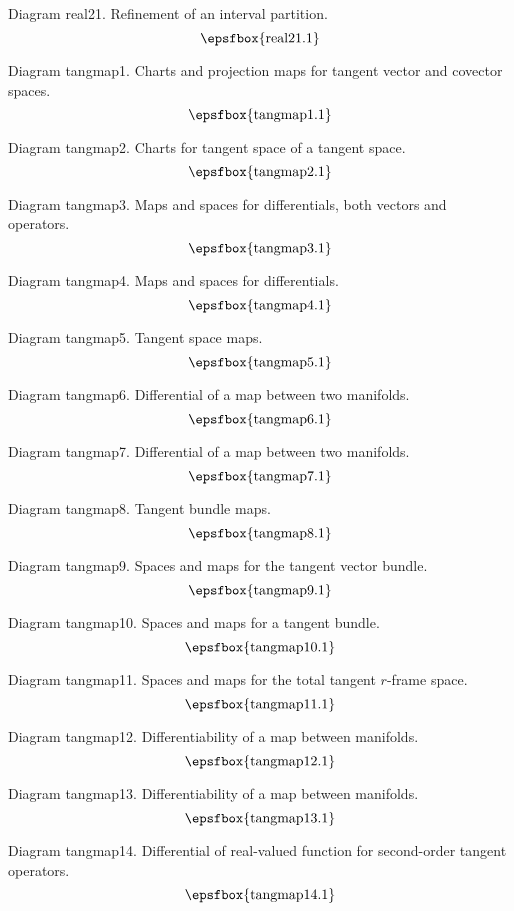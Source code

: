 Diagram real21. Refinement of an interval partition.
$$
\centerline{\epsfbox{real21.1}}
$$

\secteject
\edef\SECTtangmap{\the\pageno}

Diagram tangmap1. Charts and projection maps for tangent vector and covector
spaces.
$$
\centerline{\epsfbox{tangmap1.1}}
$$

Diagram tangmap2. Charts for tangent space of a tangent space.
$$
\centerline{\epsfbox{tangmap2.1}}
$$

Diagram tangmap3. Maps and spaces for differentials, both vectors and operators.
$$
\centerline{\epsfbox{tangmap3.1}}
$$

Diagram tangmap4. Maps and spaces for differentials.
$$
\centerline{\epsfbox{tangmap4.1}}
$$

\filleject

Diagram tangmap5. Tangent space maps.
$$
\centerline{\epsfbox{tangmap5.1}}
$$

Diagram tangmap6. Differential of a map between two manifolds.
$$
\centerline{\epsfbox{tangmap6.1}}
$$

Diagram tangmap7. Differential of a map between two manifolds.
$$
\centerline{\epsfbox{tangmap7.1}}
$$

Diagram tangmap8. Tangent bundle maps.
$$
\centerline{\epsfbox{tangmap8.1}}
$$

\filleject

Diagram tangmap9. Spaces and maps for the tangent vector bundle.
$$
\centerline{\epsfbox{tangmap9.1}}
$$

Diagram tangmap10. Spaces and maps for a tangent bundle.
$$
\centerline{\epsfbox{tangmap10.1}}
$$

Diagram tangmap11. Spaces and maps for the total tangent $r$-frame space.
$$
\centerline{\epsfbox{tangmap11.1}}
$$

Diagram tangmap12. Differentiability of a map between manifolds.
$$
\centerline{\epsfbox{tangmap12.1}}
$$

\filleject

Diagram tangmap13. Differentiability of a map between manifolds.
$$
\centerline{\epsfbox{tangmap13.1}}
$$

Diagram tangmap14. Differential of real-valued function for second-order tangent
operators.
$$
\centerline{\epsfbox{tangmap14.1}}
$$

